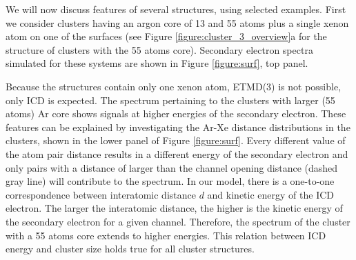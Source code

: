 We will now discuss features of several structures, using selected examples.
First we consider clusters having an argon core of 13 and 55 atoms plus a single xenon
atom on one of the surfaces (see Figure \ref{figure:cluster_3_overview}a
for the structure of clusters with the 55 atoms core).
Secondary electron spectra simulated for these systems are shown in Figure \ref{figure:surf}, top panel.

Because the structures contain only one xenon atom, ETMD(3) is not possible, only ICD is expected. 
The spectrum pertaining to the clusters with larger (55 atoms) Ar core shows
signals at higher energies of the secondary electron. These features
can be explained by investigating the Ar-Xe distance distributions
in the clusters, shown
in the lower panel of Figure \ref{figure:surf}. 
Every different value of the atom pair distance
results in a different energy of the secondary electron and only pairs
with a distance of larger than the channel opening distance
(dashed gray line) will contribute
to the spectrum. 
In our model, there is a one-to-one correspondence between interatomic distance $d$ and kinetic energy of the ICD electron.
The larger the interatomic distance, the higher is the
kinetic energy of the secondary electron for a given channel.
Therefore, the spectrum of the cluster with a 55 atoms core extends to higher energies.
This relation between ICD energy and cluster size holds true for all cluster structures.

